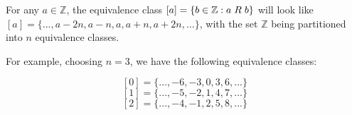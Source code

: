 \documentclass[a4paper,12pt]{article}
\begin{document}
For any $a \in \mathbb{Z}$, the equivalence class $[a] = \{b \in \mathbb{Z} : a \hspace{1mm} R \hspace{1mm} b\}$ will look like $[a] = \{ ..., a - 2n, a - n, a,  a + n, a + 2n, ...\}$, with the set $\mathbb{Z}$ being partitioned into $n$ equivalence classes. 

For example, choosing $n=3$, we have the following equivalence classes:

\[ [0] = \{ ..., -6, -3, 0, 3, 6, ...\} \]
\[ [1] = \{ ..., -5, -2, 1, 4, 7, ...\} \] 
\[ [2] = \{ ..., -4, -1, 2, 5, 8, ...\} \]

\vspace{2mm}
\end{document}
